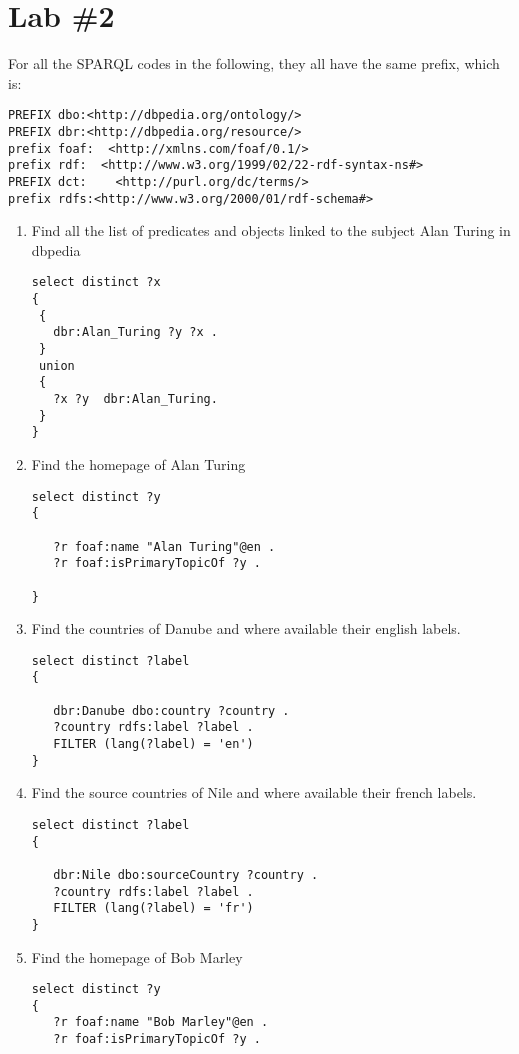 \documentclass[a4paper, 12pt]{report}
\begin{document}
\chapter{Lab \#2}
For all the SPARQL codes in the following, they all have the same prefix, which is:
\begin{lstlisting}[frame=single]
PREFIX dbo:<http://dbpedia.org/ontology/>
PREFIX dbr:<http://dbpedia.org/resource/>
prefix foaf:  <http://xmlns.com/foaf/0.1/>
prefix rdf:  <http://www.w3.org/1999/02/22-rdf-syntax-ns#>
PREFIX dct:    <http://purl.org/dc/terms/>
prefix rdfs:<http://www.w3.org/2000/01/rdf-schema#>
\end{lstlisting}

\begin{enumerate}
\item Find all the list of predicates and objects linked to the subject Alan Turing in dbpedia 
\begin{lstlisting}[frame=single]
select distinct ?x 
{
 {
   dbr:Alan_Turing ?y ?x .
 }
 union
 {
   ?x ?y  dbr:Alan_Turing.
 }
} 
\end{lstlisting}


\item Find the homepage of Alan Turing
\begin{lstlisting}[frame=single]
select distinct ?y
{

   ?r foaf:name "Alan Turing"@en .
   ?r foaf:isPrimaryTopicOf ?y .

} 
\end{lstlisting}

\item Find the countries of Danube and where available their english labels.
\begin{lstlisting}[frame=single]
select distinct ?label
{

   dbr:Danube dbo:country ?country .
   ?country rdfs:label ?label .
   FILTER (lang(?label) = 'en')
} 
\end{lstlisting}


\item Find the source countries of Nile and where available their french labels.
\begin{lstlisting}[frame=single]
select distinct ?label
{

   dbr:Nile dbo:sourceCountry ?country .
   ?country rdfs:label ?label .
   FILTER (lang(?label) = 'fr')
} 
\end{lstlisting}

\item Find the homepage of Bob Marley
\begin{lstlisting}[frame=single]
select distinct ?y
{
   ?r foaf:name "Bob Marley"@en .
   ?r foaf:isPrimaryTopicOf ?y .


\end{lstlisting}
\end{enumerate}
\end{document}
